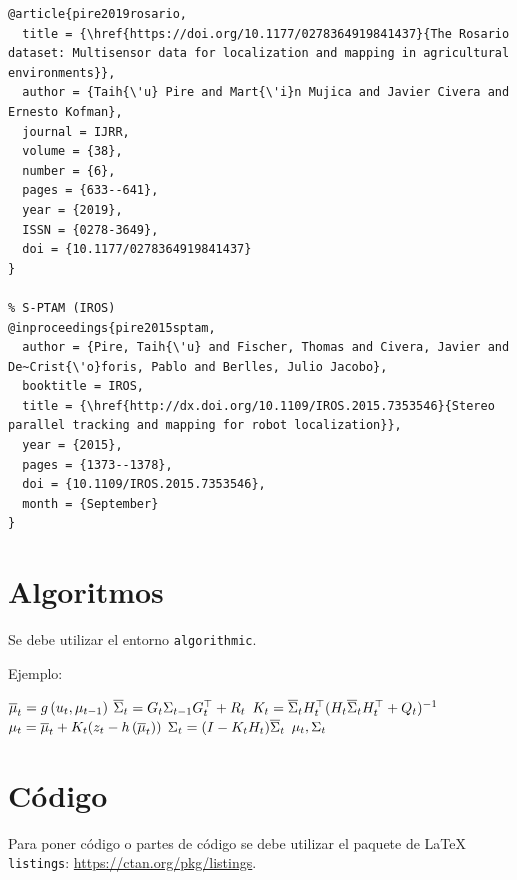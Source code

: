 \documentclass[a4paper,	11pt]{article}
\begin{document}
\begin{lstlisting}[style=bash] 
% The Rosario Dataset
@article{pire2019rosario,
  title = {\href{https://doi.org/10.1177/0278364919841437}{The Rosario dataset: Multisensor data for localization and mapping in agricultural environments}},
  author = {Taih{\'u} Pire and Mart{\'i}n Mujica and Javier Civera and Ernesto Kofman},
  journal = IJRR,
  volume = {38},
  number = {6},
  pages = {633--641},
  year = {2019},
  ISSN = {0278-3649},
  doi = {10.1177/0278364919841437}
}

% S-PTAM (IROS)
@inproceedings{pire2015sptam, 
  author = {Pire, Taih{\'u} and Fischer, Thomas and Civera, Javier and De~Crist{\'o}foris, Pablo and Berlles, Julio Jacobo},
  booktitle = IROS, 
  title = {\href{http://dx.doi.org/10.1109/IROS.2015.7353546}{Stereo parallel tracking and mapping for robot localization}},
  year = {2015}, 
  pages = {1373--1378},
  doi = {10.1109/IROS.2015.7353546}, 
  month = {September}
}
\end{lstlisting}

\section{Algoritmos}

Se debe utilizar el entorno \lstinline{algorithmic}.

Ejemplo:
    \begin{algorithmic}[1]
        \State $\overline{\mu}_{t} = g\left( u_{t}, \mu_{t-1} \right)$
        \State $\overline{\Sigma}_{t} = G_{t} \Sigma_{t-1} G_{t}^{\top}+R_{t}$
        \Statex
        \State $K_{t} = \overline{\Sigma}_{t} H_{t}^{\top} (H_{t} \overline{\Sigma}_{t}  H_{t}^{\top} + Q_{t})^{-1} $
        \State $\mu_{t} = \overline{\mu}_{t} + K_{t} (z_{t} - h\left( \overline{\mu}_{t} \right))$
        \State $\Sigma_{t} =  (I - K_{t} H_{t}) \overline{\Sigma}_{t}$
        \State \Return $\mu_{t}, \Sigma_{t}$
    \EndProcedure
    \end{algorithmic}

\section{Código}
Para poner código o partes de código se debe utilizar el paquete de {\LaTeX} \lstinline{listings}: \url{https://ctan.org/pkg/listings}.
\end{document}
